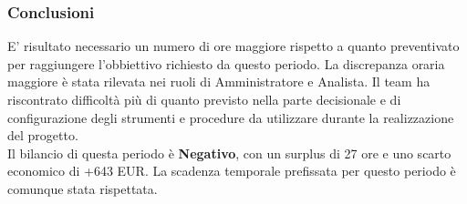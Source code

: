 \subsubsection{Conclusioni}
E' risultato necessario un numero di ore maggiore rispetto a quanto preventivato per raggiungere l'obbiettivo richiesto da questo periodo. La discrepanza oraria maggiore è stata rilevata nei ruoli di Amministratore e Analista. Il team ha riscontrato difficoltà più di quanto previsto nella parte decisionale e di configurazione degli strumenti e procedure da utilizzare durante la realizzazione del progetto.
\\Il bilancio di questa periodo è \textbf{Negativo}, con un surplus di 27 ore e uno scarto economico di +643 EUR. La scadenza temporale prefissata per questo periodo è comunque stata rispettata.
